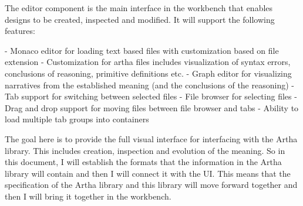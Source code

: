 The editor component is the main interface in the workbench that enables designs to be created, inspected and modified. It will support the following features:

- Monaco editor for loading text based files with customization based on file extension
- Customization for artha files includes visualization of syntax errors, conclusions of reasoning, primitive definitions etc.
- Graph editor for visualizing narratives from the established meaning (and the conclusions of the reasoning)
- Tab support for switching between selected files
- File browser for selecting files 
- Drag and drop support for moving files between file browser and tabs
- Ability to load multiple tab groups into containers

The goal here is to provide the full visual interface for interfacing with the Artha library. This includes creation, inspection and evolution of the meaning. So in this document, I will establish the formats that the information in the Artha library will contain and then I will connect it with the UI. This means that the specification of the Artha library and this library will move forward together and then I will bring it together in the workbench.